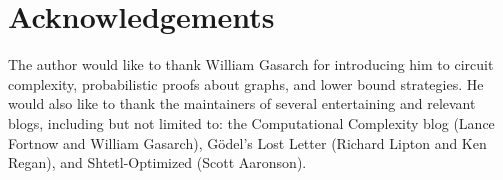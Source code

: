\documentclass[12pt]{article}
\theoremstyle{definition}
\begin{document}
\section{Acknowledgements}

The author would like to thank William Gasarch for introducing him
to circuit complexity, probabilistic proofs about graphs,
and lower bound strategies.
He would also like to thank the maintainers of
several entertaining and relevant blogs, including but
not limited to: the Computational Complexity blog
(Lance Fortnow and William Gasarch), 
G\"odel's Lost Letter (Richard Lipton and Ken Regan),
and Shtetl-Optimized (Scott Aaronson). 



\end{document}
